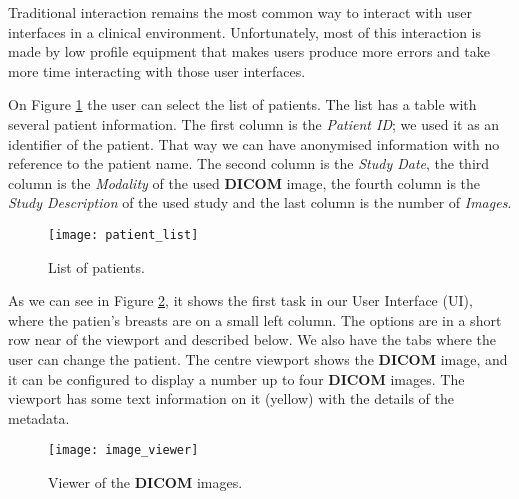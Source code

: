 Traditional interaction remains the most common way to interact with user interfaces in a clinical environment. Unfortunately, most of this interaction is made by low profile equipment that makes users produce more errors and take more time interacting with those user interfaces.

On Figure \ref{fig:patient_list} the user can select the list of patients. The list has a table with several patient information. The first column is the \textit{Patient ID}; we used it as an identifier of the patient. That way we can have anonymised information with no reference to the patient name. The second column is the \textit{Study Date}, the third column is the \textit{Modality} of the used \textbf{DICOM} image, the fourth column is the \textit{Study Description} of the used study and the last column is the number of \textit{Images}.


\hfill

\begin{figure}[h]
\centering
\texttt{[image: patient\_list]}
\caption{List of patients.}
\label{fig:patient_list}
\end{figure}

\hfill


As we can see in Figure \ref{fig:image_viewer}, it shows the first task in our User Interface (UI), where the patien's breasts are on a small left column. The options are in a short row near of the viewport and described below. We also have the tabs where the user can change the patient. The centre viewport shows the \textbf{DICOM} image, and it can be configured to display a number up to four \textbf{DICOM} images. The viewport has some text information on it (yellow) with the details of the metadata.

\clearpage


\hfill

\begin{figure}[h]
\centering
\texttt{[image: image\_viewer]}
\caption{Viewer of the \textbf{DICOM} images.}
\label{fig:image_viewer}
\end{figure}

\hfill



